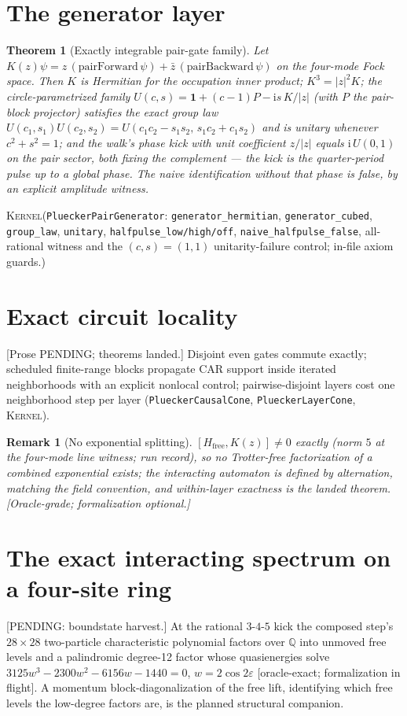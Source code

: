 \documentclass[11pt]{article}
\newcommand{\ii}{\mathrm{i}}
\newcommand{\id}{\mathbf{1}}
\newcommand{\Kernel}{\textcolor{kernelcolor}{\textsc{Kernel}}}
\newtheorem{theorem}{Theorem}
\newtheorem{remark}{Remark}
\begin{document}
\section{The generator layer}

\begin{theorem}[Exactly integrable pair-gate family]\label{thm:gen}
Let $K(z)\psi = z\,(\text{pairForward}\,\psi) +
\bar z\,(\text{pairBackward}\,\psi)$ on the four-mode Fock space.  Then
$K$ is Hermitian for the occupation inner product; $K^3=|z|^2K$; the
circle-parametrized family
$U(c,s)=\id+(c-1)P-\ii s\,K/|z|$ (with $P$ the pair-block projector)
satisfies the exact group law
$U(c_1,s_1)U(c_2,s_2)=U(c_1c_2-s_1s_2,\,s_1c_2+c_1s_2)$ and is unitary
whenever $c^2+s^2=1$; and the walk's phase kick with unit coefficient
$z/|z|$ equals $\ii\,U(0,1)$ on the pair sector, both fixing the
complement --- the kick is the quarter-period pulse up to a global
phase.  The naive identification without that phase is false, by an
explicit amplitude witness.
\end{theorem}
\noindent\Kernel{}\quad(\texttt{PlueckerPairGenerator}:
\texttt{generator\_hermitian}, \texttt{generator\_cubed},
\texttt{group\_law}, \texttt{unitary}, \texttt{halfpulse\_low/high/off},
\texttt{naive\_halfpulse\_false}, all-rational witness and the
$(c,s)=(1,1)$ unitarity-failure control; in-file axiom guards.)

\section{Exact circuit locality}
[Prose PENDING; theorems landed.]  Disjoint even gates commute exactly;
scheduled finite-range blocks propagate CAR support inside iterated
neighborhoods with an explicit nonlocal control; pairwise-disjoint
layers cost one neighborhood step per layer
(\texttt{PlueckerCausalCone}, \texttt{PlueckerLayerCone}, \Kernel{}).

\begin{remark}[No exponential splitting]
$[H_{\mathrm{free}},K(z)]\neq0$ exactly (norm $5$ at the four-mode line
witness; run record), so no Trotter-free factorization of a combined
exponential exists; the interacting automaton is \emph{defined} by
alternation, matching the field convention, and within-layer exactness
is the landed theorem.  [Oracle-grade; formalization optional.]
\end{remark}

\section{The exact interacting spectrum on a four-site ring}
[PENDING: boundstate harvest.]  At the rational $3$-$4$-$5$ kick the
composed step's $28\times28$ two-particle characteristic polynomial
factors over $\mathbb{Q}$ into unmoved free levels and a palindromic
degree-12 factor whose quasienergies solve
$3125w^3-2300w^2-6156w-1440=0$, $w=2\cos2\varepsilon$ [oracle-exact;
formalization in flight].  A momentum block-diagonalization of the free
lift, identifying which free levels the low-degree factors are, is the
planned structural companion.
\end{document}
